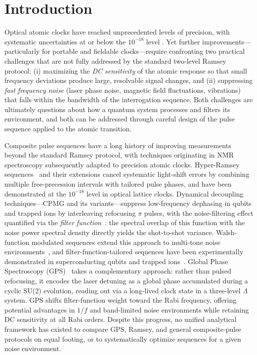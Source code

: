 \documentclass[aps,pra,twocolumn,superscriptaddress,longbibliography]{revtex4-2}
\begin{document}
\maketitle

\section{Introduction}
\label{sec:intro}

Optical atomic clocks have reached unprecedented levels of precision, with systematic
uncertainties at or below the $10^{-18}$ level \cite{Bloom2014,Ushijima2015,McGrew2018}.
Yet further improvements---particularly for portable and fieldable clocks---require confronting
two practical challenges that are not fully addressed by the standard two-level Ramsey protocol:
(i) maximizing the \emph{DC sensitivity} of the atomic response so that small frequency
deviations produce large, resolvable signal changes, and
(ii) suppressing \emph{fast frequency noise} (laser phase noise, magnetic field fluctuations,
vibrations) that falls within the bandwidth of the interrogation sequence.
Both challenges are ultimately questions about how a quantum system processes and filters
its environment, and both can be addressed through careful design of the pulse sequence
applied to the atomic transition.

Composite pulse sequences have a long history of improving measurements beyond the
standard Ramsey protocol, with techniques originating in NMR spectroscopy subsequently
adapted to precision atomic clocks.
Hyper-Ramsey sequences~\cite{Yudin2010,Huntemann2012} and their extensions cancel
systematic light-shift errors by combining multiple free-precession intervals with
tailored pulse phases, and have been demonstrated at the $10^{-18}$ level in
optical lattice clocks.
Dynamical decoupling techniques---CPMG and its variants---suppress low-frequency
dephasing in qubits and trapped ions by interleaving refocusing $\pi$ pulses, with the
noise-filtering effect quantified via the \emph{filter function}~\cite{Cywinski2008,Green2013}:
the spectral overlap of this function with the noise power spectral density directly
yields the shot-to-shot variance.
Walsh-function modulated sequences extend this approach to multi-tone noise
environments~\cite{Hayes2011,Magesan2011}, and filter-function-tailored sequences have
been experimentally demonstrated in superconducting qubits and trapped
ions~\cite{Biercuk2009,Bylander2011}.
Global Phase Spectroscopy (GPS)~\cite{GPS} takes a complementary approach: rather than
pulsed refocusing, it encodes the laser detuning as a global phase accumulated during
a cyclic SU(2) evolution, reading out via a long-lived clock state in a three-level
$\Lambda$ system.
GPS shifts filter-function weight toward the Rabi frequency, offering potential
advantages in $1/f$ and band-limited noise environments while retaining DC sensitivity
at all Rabi orders.
Despite this progress, no unified analytical framework has existed to compare GPS, Ramsey,
and general composite-pulse protocols on equal footing, or to systematically optimize
sequences for a given noise environment.
\end{document}
